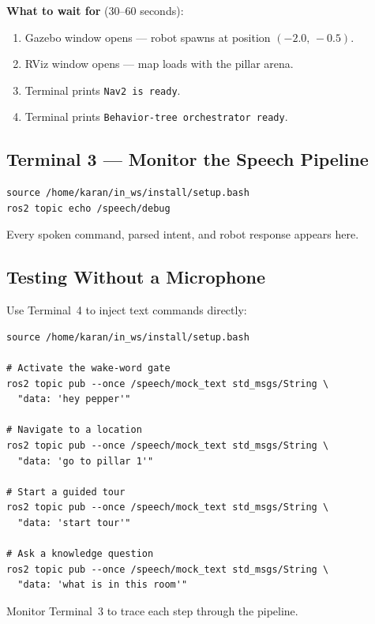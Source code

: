 \documentclass[12pt,a4paper]{report}
\begin{document}
\textbf{What to wait for} (30--60 seconds):

\begin{enumerate}[leftmargin=2em]
  \item Gazebo window opens --- robot spawns at position $(-2.0,\,-0.5)$.
  \item RViz window opens --- map loads with the pillar arena.
  \item Terminal prints \texttt{Nav2 is ready}.
  \item Terminal prints \texttt{Behavior-tree orchestrator ready}.
\end{enumerate}

\subsection{Terminal 3 --- Monitor the Speech Pipeline}

\begin{lstlisting}[style=bashstyle]
source /home/karan/in_ws/install/setup.bash
ros2 topic echo /speech/debug
\end{lstlisting}

Every spoken command, parsed intent, and robot response appears here.

\subsection{Testing Without a Microphone}
\label{app:mock-input}

Use Terminal~4 to inject text commands directly:

\begin{lstlisting}[style=bashstyle, caption={Mock speech input via ROS topic}]
source /home/karan/in_ws/install/setup.bash

# Activate the wake-word gate
ros2 topic pub --once /speech/mock_text std_msgs/String \
  "data: 'hey pepper'"

# Navigate to a location
ros2 topic pub --once /speech/mock_text std_msgs/String \
  "data: 'go to pillar 1'"

# Start a guided tour
ros2 topic pub --once /speech/mock_text std_msgs/String \
  "data: 'start tour'"

# Ask a knowledge question
ros2 topic pub --once /speech/mock_text std_msgs/String \
  "data: 'what is in this room'"
\end{lstlisting}

Monitor Terminal~3 to trace each step through the pipeline.
\end{document}
